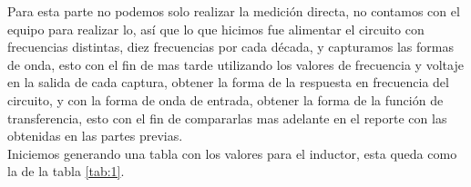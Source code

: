 \documentclass[letterpaper,spanish,12pt]{report}
\begin{document}
Para esta parte no podemos solo realizar la medici\'on directa, no contamos con el equipo para realizar lo, as\'i que lo que hicimos fue alimentar el circuito con frecuencias distintas, diez frecuencias por cada d\'ecada, y capturamos las formas de onda, esto con el fin de mas tarde utilizando los valores de frecuencia y voltaje en la salida de cada captura, obtener la forma de la respuesta en frecuencia del circuito, y con la forma de onda de entrada, obtener la forma de la funci\'on de transferencia, esto con el fin de compararlas mas adelante en el reporte con las obtenidas en las partes previas.\\ Iniciemos generando una tabla con los valores para el inductor, esta queda como la de la tabla \ref{tab:1}.\\

\end{document}
